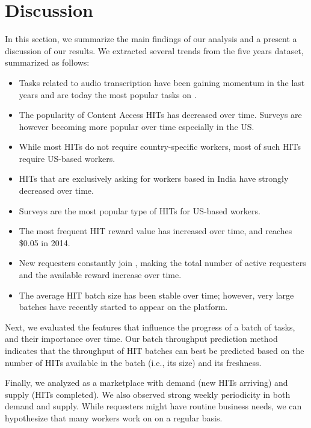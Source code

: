 \section{Discussion}
\label{sec:discuss}

In this section, we summarize the main findings of our analysis and a present a discussion of our results. We  extracted several trends from the five years dataset, summarized as follows:
\begin{itemize}[noitemsep,topsep=0pt,parsep=0pt,partopsep=0pt]
	\item Tasks related to audio transcription have been gaining momentum in the last years and are today the most popular tasks on \amt{}.
	\item The popularity of Content Access HITs has decreased over time. Surveys are however becoming more popular over time especially in the US.
	\item While most HITs do not require country-specific workers, most of such HITs require US-based workers.
	\item HITs that are exclusively asking for workers based in India have strongly decreased over time.
	\item Surveys are the most popular type of HITs for US-based workers.
	\item The most frequent HIT reward value has increased over time, and reaches \$0.05 in 2014.
	\item New requesters constantly join \amt{}, making the total number of active requesters and the available reward increase over time.
	\item The average HIT batch size has been stable over time; however, very large batches have recently started to appear on the platform.
\end{itemize}

Next, we evaluated the features that influence the progress of a batch of tasks, and their importance over time. Our batch throughput prediction method indicates that the throughput of HIT batches can best be predicted based on the number of HITs available in the batch (i.e., its size) and its freshness.

Finally, we analyzed \amt{} as a marketplace with demand (new HITs arriving) and supply (HITs completed). 
We also observed strong weekly periodicity in both demand and supply. While requesters might have routine business needs, we can hypothesize that many workers work on \amt{} on a regular basis.